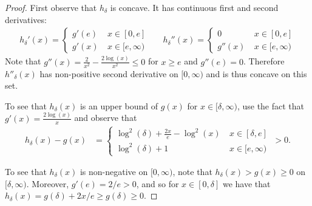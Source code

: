 \begin{proof}

First observe that $h_{\delta}$ is concave.
It has continuous first and second derivatives:
\begin{align*}
    h_{\delta}'(x) = \begin{cases} 
    g'(e) & \: x \in [0, e]\\
    g'(x) & \: x \in [e, \infty)
    \end{cases}
    &&
    h_{\delta}''(x) = \begin{cases} 
    0 & \: x \in [0, e]\\
    g''(x) & \: x \in [e, \infty)
    \end{cases}
\end{align*}
Note that $g''(x) = \frac{2}{x^2} - \frac{2 \log(x)}{x^2} \leq 0$ for $x \geq e$ and $g''(e) = 0$.
Therefore $h''_{\delta}(x)$ has non-positive second derivative on $[0, \infty)$ and is thus concave on this set.

To see that $h_{\delta}(x)$ is an upper bound of $g(x)$ for $x \in [\delta, \infty)$, use the fact that $g'(x) = \frac{2\log(x)}{x}$ and observe that
\begin{align*}
    h_{\delta}(x) - g(x)
    &= \begin{cases} 
    \log^2(\delta) + \frac{2x}{e} - \log^2(x)& \: x \in [\delta, e]\\
    \log^2(\delta) + 1& \: x \in [e, \infty)
    \end{cases}
    \ > 0.
\end{align*}

To see that $h_{\delta}(x)$ is non-negative on $[0, \infty)$, note that $h_{\delta}(x) > g(x) \geq 0$ on $[\delta, \infty)$. 
Moreover, $g'(e) = 2/e > 0$, and so for $x \in [0, \delta]$ we have that $h_{\delta}(x) = g(\delta) + 2x/e \geq g(\delta) \geq 0$.
\end{proof}

